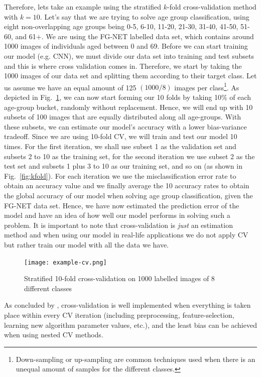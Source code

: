Therefore, lets take an example using the stratified $k$-fold cross-validation method with $k=10$. Let's say that we are trying to solve age group classification, using eight non-overlapping age groups being 0-5, 6-10, 11-20, 21-30, 31-40, 41-50, 51-60, and 61+. We are using the FG-NET labelled data set, which contains around 1000 images of individuals aged between 0 and 69. Before we can start training our model (e.g. CNN), we must divide our data set into training and test subsets and this is where cross validation comes in. Therefore, we start by taking the 1000 images of our data set and splitting them according to their target class. Let us assume we have an equal amount of 125 $(1000/8)$ images per class\footnote{Down-sampling or up-sampling are common techniques used when there is an unequal amount of samples for the different classes.}. As depicted in Fig.~\ref{fig:example}, we can now start forming our 10 folds by taking 10\% of each age-group bucket, randomly without replacement. Hence, we will end up with 10 subsets of 100 images that are equally distributed along all age-groups. With these subsets, we can estimate our model's accuracy with a lower bias-variance tradeoff. Since we are using 10-fold CV, we will train and test our model 10 times. For the first iteration, we shall use subset 1 as the validation set and subsets 2 to 10 as the training set, for the second iteration we use subset 2 as the test set and subsets 1 plus 3 to 10 as our training set, and so on (as shown in Fig.~\ref{fig:kfold}). For each iteration we use the misclassification error rate to obtain an accuracy value and we finally average the 10 accuracy rates to obtain the global accuracy of our model when solving age group classification, given the FG-NET data set. Hence, we have now estimated the prediction error of the model and have an idea of how well our model performs in solving such a problem. It is important to note that cross-validation is \textit{just} an estimation method and when using our model in real-life applications we do not apply CV but rather train our model with all the data we have.

\begin{figure}
\centering
  \texttt{[image: example-cv.png]}
  \caption{Stratified 10-fold cross-validation on 1000 labelled images of 8 different classes}
  \label{fig:example}
\end{figure}

As concluded by \cite{varma2006bias}, cross-validation is well implemented when everything is taken place within every CV iteration (including preprocessing, feature-selection, learning new algorithm parameter values, etc.), and the least bias can be achieved when using nested CV methods.



